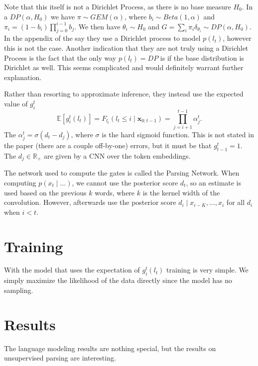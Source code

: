 \documentclass{article}
\newcommand\E[1]{\mathbb{E}\left[#1\right]}
\newcommand{\bx}{\mathbf{x}}
\newcommand{\R}{\mathbb{R}}
\begin{document}
Note that this itself is not a Dirichlet Process, as there is no base measure $H_0$.
In a $DP(\alpha, H_0)$ we have $\pi \sim GEM(\alpha)$,
where $b_i \sim Beta(1,\alpha)$ and $\pi_i = (1-b_i)\prod_{j=0}^{i-1}b_j$.
We then have $\theta_i\sim H_0$ and $G = \sum_i\pi_i\delta_{\theta_i}\sim DP(\alpha, H_0)$.
In the appendix of \citet{shen2018prpn} the say they use a Dirichlet process to model $p(l_t)$,
however this is not the case.
Another indication that they are not truly using a Dirichlet Process is the fact that
the only way $p(l_t) = DP$ is if the base distribution is Dirichlet as well.
This seems complicated and would definitely warrant further explanation.

Rather than resorting to approximate inference, they instead use the expected value of $g_i^t$
$$\E{g_i^t(l_t)} = F_{l_t}(l_t \le i\mid\bx_{0:t-1}) = \prod_{j=i+1}^{t-1}\alpha_j^t.$$
The $\alpha_j^t = \sigma(d_t - d_j)$, where $\sigma$ is the hard sigmoid function.
This is not stated in the paper (there are a couple off-by-one) errors,
but it must be that $g_{t-1}^t = 1$.
The $d_j\in\R_+$ are given by a CNN over the token embeddings.

The network used to compute the gates is called the Parsing Network.
When computing $p(x_t\mid\ldots)$, we cannot use the posterior score $d_t$,
so an estimate is used based on the previous $k$ words, where $k$ is the 
kernel width of the convolution.
However, afterwards \citet{shen2018prpn} use the posterior score $d_i \mid x_{i-K},\ldots, x_i$
for all $d_i$ when $i < t$.

\section{Training}
With the model that uses the expectation of $g_i^t(l_t)$
training is very simple.
We simply maximize the likelihood of the data directly since the model has no
sampling.

\section{Results}
The language modeling results are nothing special,
but the results on unsupervised parsing are interesting.

\begin{comment}
\section{Comparison to CCM \citep{klein-2002-ccm}}
\citep{klein-2002-ccm2}
\citep{golland-2012-ccm,huang-2012-ccm}
\section{Comparison to StructVae \citep{yin18structvae}}
Hm, if we generated context given span, would that encourage non-constituents?
General question about segmental models.
\end{comment}
\end{document}
